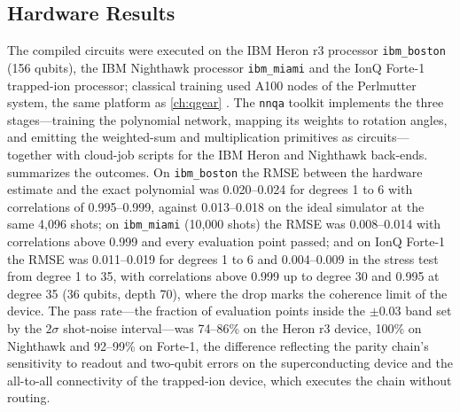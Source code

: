 \subsection{Hardware Results}\label{sec:qml:nnqa:hw}

The compiled circuits were executed on the IBM Heron r3 processor \texttt{ibm\_boston} (156 qubits), the IBM Nighthawk processor \texttt{ibm\_miami} and the IonQ Forte-1 trapped-ion processor; classical training used A100 nodes of the Perlmutter system, the same platform as \cref{ch:qgear} \cite{guo2026nnqa}. The \texttt{nnqa} toolkit implements the three stages---training the polynomial network, mapping its weights to rotation angles, and emitting the weighted-sum and multiplication primitives as \qiskit{} circuits---together with cloud-job scripts for the IBM Heron and Nighthawk back-ends.  summarizes the outcomes. On \texttt{ibm\_boston} the RMSE between the hardware estimate and the exact polynomial was 0.020--0.024 for degrees 1 to 6 with correlations of 0.995--0.999, against 0.013--0.018 on the ideal simulator at the same 4,096 shots; on \texttt{ibm\_miami} (10,000 shots) the RMSE was 0.008--0.014 with correlations above 0.999 and every evaluation point passed; and on IonQ Forte-1 the RMSE was 0.011--0.019 for degrees 1 to 6 and 0.004--0.009 in the stress test from degree 1 to 35, with correlations above 0.999 up to degree 30 and 0.995 at degree 35 (36 qubits, depth 70), where the drop marks the coherence limit of the device. The pass rate---the fraction of evaluation points inside the $\pm0.03$ band set by the $2\sigma$ shot-noise interval---was 74--86\% on the Heron r3 device, 100\% on Nighthawk and 92--99\% on Forte-1, the difference reflecting the parity chain's sensitivity to readout and two-qubit errors on the superconducting device and the all-to-all connectivity of the trapped-ion device, which executes the chain without routing.

